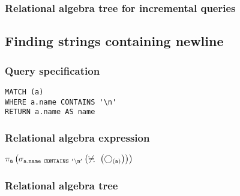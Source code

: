\subsubsection*{Relational algebra tree for incremental queries}


\subsection{Finding strings containing newline}

\subsubsection*{Query specification}

\begin{lstlisting}
MATCH (a)
WHERE a.name CONTAINS '\n'
RETURN a.name AS name
\end{lstlisting}

\subsubsection*{Relational algebra expression}

$\projection{\var{a}} \left(\selection{\mathtt{a.name~CONTAINS~'\backslash{}n'}} \left(\alldifferent{} \left(\getvertices{a}{}\right)\right)\right)$

\subsubsection*{Relational algebra tree}


